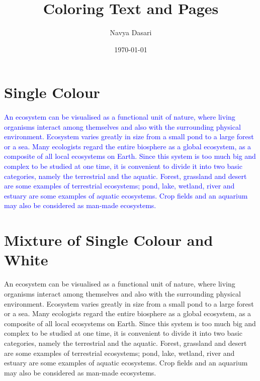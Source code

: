 \documentclass[12pt]{article}
\title{Coloring Text and Pages}
\author{Navya Dasari}
\date{\today}
\begin{document}
	
	\maketitle
	\section{Single Colour}
	\paragraph{}
	
	\textcolor{blue}{An ecosystem can be visualised as a functional unit of nature, where living 
		organisms interact among themselves and also with the surrounding physical 
		environment. Ecosystem varies greatly in size from a small pond to a large forest or a 
		sea. Many ecologists regard the entire biosphere as a global ecosystem, as a composite 
		of all local ecosystems on Earth. Since this system is too much big and complex to be 
		studied at one time, it is convenient to divide it into two basic categories, namely the 
		terrestrial and the aquatic. Forest, grassland and desert are some examples of terrestrial 
		ecosystems; pond, lake, wetland, river and estuary are some examples of aquatic 
		ecosystems. Crop fields and an aquarium may also be considered as man-made 
		ecosystems.} \\
		
		\section{Mixture of Single Colour and White}
		
	\textcolor{red!70}{An ecosystem can be visualised as a functional unit of nature, where living 
		organisms interact among themselves and also with the surrounding physical 
		environment. Ecosystem varies greatly in size from a small pond to a large forest or a 
		sea. Many ecologists regard the entire biosphere as a global ecosystem, as a composite 
		of all local ecosystems on Earth. Since this system is too much big and complex to be 
		studied at one time, it is convenient to divide it into two basic categories, namely the 
		terrestrial and the aquatic. Forest, grassland and desert are some examples of terrestrial 
		ecosystems; pond, lake, wetland, river and estuary are some examples of aquatic 
		ecosystems. Crop fields and an aquarium may also be considered as man-made 
		ecosystems.} \\
		
\end{document}
